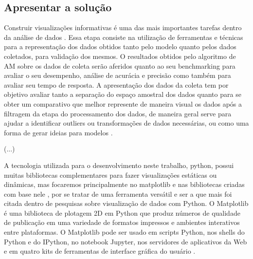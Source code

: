 \subsection{Apresentar a solução}
Construir visualizações informativas é uma das mais importantes tarefas dentro da análise de dados \cite{McKinney2012datapython}. Essa etapa consiste na utilização de ferramentas e técnicas para a representação dos dados obtidos tanto pelo modelo quanto pelos dados coletados, para validação dos mesmos. O resultados obtidos pelo algoritmo de AM sobre os dados de coleta serão aferidos quanto ao seu benchmarking \cite{Benchmarking} para avaliar o seu desempenho, análise de acurácia e precisão como também para avaliar seu tempo de resposta. A apresentação dos dados da coleta tem por objetivo avaliar tanto a separação do espaço amostral dos dados quanto para se obter um comparativo que melhor represente de maneira visual os dados após a filtragem da etapa do processamento dos dados, de maneira geral serve para ajudar a identificar outliers ou transformações de dados necessárias, ou como uma forma de gerar ideias para modelos \cite{McKinney2012datapython}.	
	
(...)

A tecnologia utilizada para o desenvolvimento neste trabalho, python, possui muitas bibliotecas complementares para fazer visualizações estáticas ou dinâmicas, mas focaremos principalmente no matplotlib e nas bibliotecas criadas com base nele \cite{McKinney2012datapython}, por se tratar de uma ferramenta versátil e ser a que mais foi citada dentro de pesquisas sobre visualização de dados com Python.
O Matplotlib é uma biblioteca de plotagem 2D em Python que produz números de qualidade de publicação em uma variedade de formatos impressos e ambientes interativos entre plataformas. O Matplotlib pode ser usado em scripts Python, nos shells do Python e do IPython, no notebook Jupyter, nos servidores de aplicativos da Web e em quatro kits de ferramentas de interface gráfica do usuário \cite{Matplotlib}.


